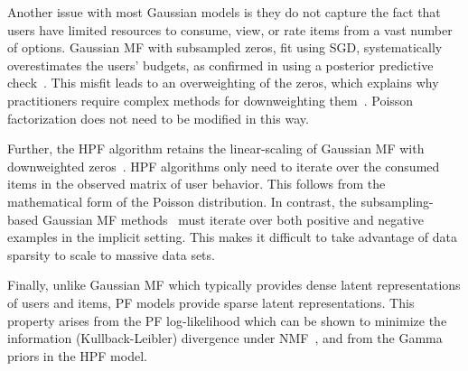 Another issue with most Gaussian models is they do not capture the fact that
users have limited resources to consume, view, or rate items from a
vast number of options.
Gaussian MF with subsampled zeros, fit using SGD, systematically
overestimates the users' budgets, as confirmed in  using a
posterior predictive check~\cite{Gelman:1996}. This misfit leads to an
overweighting of the zeros, which explains why practitioners require
complex methods for downweighting
them~\cite{Dror:2012a,Gantner:2012p9364,Hu:2008p9402,Paquet:2013p9197}.
Poisson factorization does not need to be modified in this way.


Further, the HPF algorithm retains the linear-scaling of Gaussian MF
with downweighted zeros~\cite{Hu:2008p9402}. HPF algorithms only need
to iterate over the consumed items in the observed matrix of user
behavior. This follows from the mathematical form of the Poisson
distribution.  In contrast, the subsampling-based Gaussian MF
methods~\cite{Dror:2012a,Gantner:2012p9364,Paquet:2013p9197} must
iterate over both positive and negative examples in the implicit
setting. This makes it difficult to take advantage of data sparsity to
scale to massive data sets.

Finally, unlike Gaussian MF which typically provides dense latent
representations of users and items, PF models provide sparse latent
representations. This property arises from the PF log-likelihood which
can be shown to minimize the information (Kullback-Leibler) divergence
under NMF~\cite{Cemgil:2009}, and from the Gamma priors in the HPF model.

